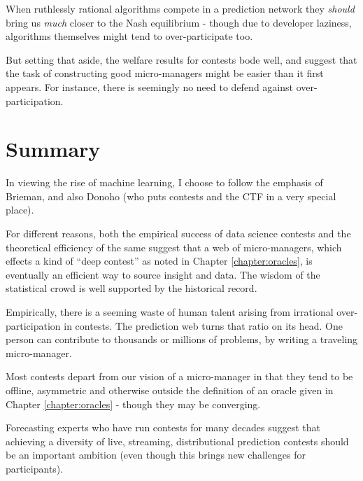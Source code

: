 When ruthlessly rational algorithms compete in a prediction network they {\em should} bring us {\em much} closer to the Nash equilibrium - though due to developer laziness, algorithms themselves might tend to over-participate too.

But setting that aside, the welfare results for contests bode well, and suggest that the task of constructing good micro-managers might be easier than it first appears. For instance, there is seemingly no need to defend against over-participation. 

\section{Summary}


In viewing the rise of machine learning, I choose to follow the emphasis of Brieman, and also Donoho (who puts contests and the CTF in a very special place). 

For different reasons, both the empirical success of data science contests and the theoretical efficiency of the same suggest that a web of micro-managers, which effects a kind of ``deep contest'' as noted in Chapter \ref{chapter:oracles}, is eventually an efficient way to source insight and data. The wisdom of the statistical crowd is well supported by the historical record. 

Empirically, there is a seeming waste of human talent arising from irrational over-participation in contests. The prediction web turns that ratio on its head. One person can contribute to thousands or millions of problems, by writing a traveling micro-manager.

Most contests depart from our vision of a micro-manager in that they tend to be offline, asymmetric and otherwise outside the definition of an oracle given in Chapter \ref{chapter:oracles} - though they may be converging. 

Forecasting experts who have run contests for many decades suggest that achieving a diversity of live, streaming, distributional prediction contests should be an important ambition (even though this brings new challenges for participants).  






